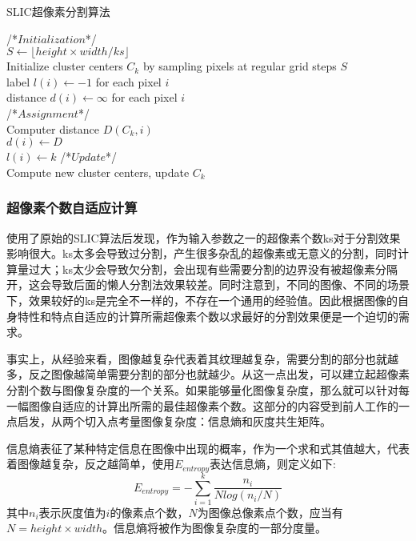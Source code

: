 \documentclass[UTF8]{ctexart}
\begin{document}
\begin{algorithm}[H]
    \caption{SLIC超像素分割算法}
    /*$Initialization$*/\\
    $S \leftarrow \lfloor height \times width/ks \rfloor$\\
    Initialize cluster centers $C_k$ by sampling pixels at regular grid steps $S$\\
    label $l(i) \leftarrow -1$ for each pixel $i$\\
    distance $d(i) \leftarrow \infty$ for each pixel $i$\\
    /*$Assignment$*/\\
    {
        {
            {
                Computer distance $D(C_k,i)$\\
                {
                    $d(i)\leftarrow D$\\
                    $l(i)\leftarrow k$
                }
            }
        }
        /*$Update$*/\\
        Compute new cluster centers, update $C_k$
    }
\end{algorithm}

\subsubsection{超像素个数自适应计算}
使用了原始的SLIC算法后发现，作为输入参数之一的超像素个数ks对于分割效果影响很大。ks太多会导致过分割，产生很多杂乱的超像素或无意义的分割，同时计算量过大；ks太少会导致欠分割，会出现有些需要分割的边界没有被超像素分隔开，这会导致后面的懒人分割法效果较差。同时注意到，不同的图像、不同的场景下，效果较好的ks是完全不一样的，不存在一个通用的经验值。因此根据图像的自身特性和特点自适应的计算所需超像素个数以求最好的分割效果便是一个迫切的需求。

事实上，从经验来看，图像越复杂代表着其纹理越复杂，需要分割的部分也就越多，反之图像越简单需要分割的部分也就越少。从这一点出发，可以建立起超像素分割个数与图像复杂度的一个关系。如果能够量化图像复杂度，那么就可以针对每一幅图像自适应的计算出所需的最佳超像素个数。这部分的内容受到前人工作的\cite{ref2}一点启发，从两个切入点考量图像复杂度：信息熵和灰度共生矩阵。

信息熵表征了某种特定信息在图像中出现的概率，作为一个求和式其值越大，代表着图像越复杂，反之越简单，使用$E_{entropy}$表达信息熵，则定义如下:
\begin{equation}
    E_{entropy} = - \sum^k_{i=1}\frac{n_i}{Nlog(n_i/N)}
\end{equation}
其中$n_i$表示灰度值为$i$的像素点个数，$N$为图像总像素点个数，应当有$N=height\times width$。信息熵将被作为图像复杂度的一部分度量。
\end{document}
